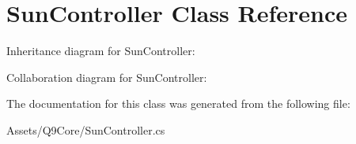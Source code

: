\hypertarget{class_sun_controller}{}\section{Sun\+Controller Class Reference}
\label{class_sun_controller}


Inheritance diagram for Sun\+Controller\+:


Collaboration diagram for Sun\+Controller\+:


The documentation for this class was generated from the following file\+:\begin{DoxyCompactItemize}
\item 
Assets/\+Q9\+Core/Sun\+Controller.\+cs\end{DoxyCompactItemize}
